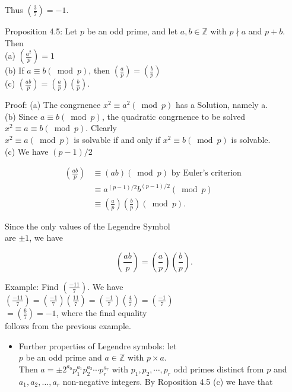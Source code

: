 \documentclass[10pt]{article}
\begin{document}
Thus $\left(\frac{3}{7}\right)=-1$.

Proposition 4.5: Let $p$ be an odd prime, and let $a, b \in \mathbb{Z}$ with $p \nmid a$ and $p+b$. Then\\
(a) $\left(\frac{a^{2}}{p}\right)=1$\\
(b) If $a \equiv b(\bmod p)$, then $\left(\frac{a}{p}\right)=\left(\frac{b}{p}\right)$\\
(c) $\left(\frac{a b}{p}\right)=\left(\frac{a}{p}\right)\left(\frac{b}{p}\right)$.

Proof: (a) The congrnence $x^{2} \equiv a^{2}(\bmod p)$ has a Solution, namely a.\\
(b) Since $a \equiv b(\bmod p)$, the quadratic congrnence to be solved $x^{2} \equiv a \equiv b(\bmod p)$. Clearly\\
$x^{2} \equiv a(\bmod p)$ is solvable if and only if $x^{2} \equiv b(\bmod p)$ is solvable.\\
(c) We have $(p-1) / 2$

$$
\begin{aligned}
\left(\frac{a b}{p}\right) & \equiv(a b)(\bmod p) \text { by Euler's criterion } \\
& \equiv a^{(p-1) / 2} b^{(p-1) / 2}(\bmod p) \\
& \equiv\left(\frac{a}{p}\right)\left(\frac{b}{p}\right)(\bmod p) .
\end{aligned}
$$

Since the only values of the Legendre Symbol\\
are $\pm 1$, we have

$$
\left(\frac{a b}{p}\right)=\left(\frac{a}{p}\right)\left(\frac{b}{p}\right) .
$$

Example: Find $\left(\frac{-11}{7}\right)$. We have\\
$\left(\frac{-11}{7}\right)=\left(\frac{-1}{7}\right)\left(\frac{11}{7}\right)=\left(\frac{-1}{7}\right)\left(\frac{4}{7}\right)=\left(\frac{-1}{7}\right)$\\
$=\left(\frac{6}{7}\right)=-1$, where the final equality\\
follows from the previous example.

\begin{itemize}
  \item Further properties of Legendre symbols: let\\
$p$ be an odd prime and $a \in \mathbb{Z}$ with $p \times a$.\\
Then $a= \pm 2^{a_{0}} p_{1}^{a_{1}} p_{2}^{a_{2}} \cdots p_{r}^{a_{r}}$ with $p_{1}, p_{2}, \cdots, p_{r}$ odd primes distinct from $p$ and $a_{1}, a_{2}, \ldots, a_{r}$ non-negative integers. By Roposition 4.5 (c) we have that
\end{itemize}
\end{document}
